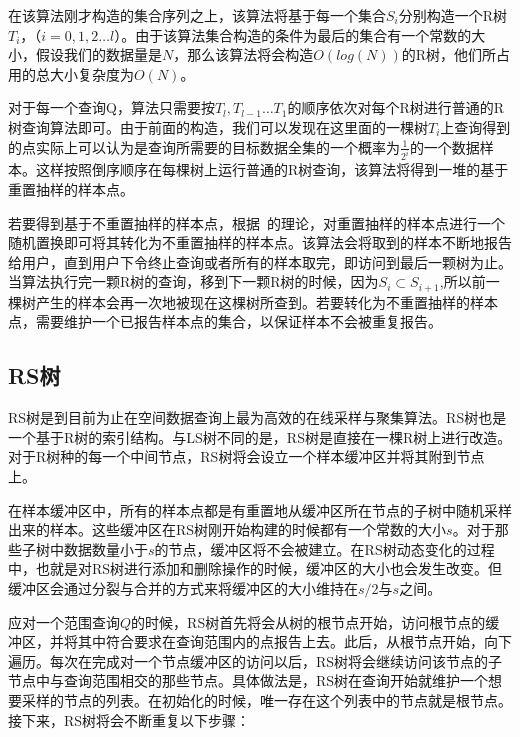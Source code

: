 在该算法刚才构造的集合序列之上，该算法将基于每一个集合$ S_{i} $分别构造一个R树$ T_{i} $，（$ i = 0,1,2 \dots l $）。由于该算法集合构造的条件为最后的集合有一个常数的大小，假设我们的数据量是$ N $，那么该算法将会构造$ O(log(N)) $的R树，他们所占用的总大小复杂度为$ O(N) $。

对于每一个查询Q，算法只需要按$ T_{l},T_{l-1} \dots T_{1} $的顺序依次对每个R树进行普通的R树查询算法即可。由于前面的构造，我们可以发现在这里面的一棵树$ T_{i} $上查询得到的点实际上可以认为是查询所需要的目标数据全集的一个概率为$ \frac{1}{2^i} $的一个数据样本。这样按照倒序顺序在每棵树上运行普通的R树查询，该算法将得到一堆的基于重置抽样的样本点。

若要得到基于不重置抽样的样本点，根据~\cite{RS07}的理论，对重置抽样的样本点进行一个随机置换即可将其转化为不重置抽样的样本点。该算法会将取到的样本不断地报告给用户，直到用户下令终止查询或者所有的样本取完，即访问到最后一颗树为止。当算法执行完一颗R树的查询，移到下一颗R树的时候，因为$ S_{i} \subset S_{i+1} $,所以前一棵树产生的样本会再一次地被现在这棵树所查到。若要转化为不重置抽样的样本点，需要维护一个已报告样本点的集合，以保证样本不会被重复报告。

\subsection{RS树}
RS树是到目前为止在空间数据查询上最为高效的在线采样与聚集算法。RS树也是一个基于R树的索引结构。与LS树不同的是，RS树是直接在一棵R树上进行改造。对于R树种的每一个中间节点，RS树将会设立一个样本缓冲区并将其附到节点上。

在样本缓冲区中，所有的样本点都是有重置地从缓冲区所在节点的子树中随机采样出来的样本。这些缓冲区在RS树刚开始构建的时候都有一个常数的大小$ s $。对于那些子树中数据数量小于$ s $的节点，缓冲区将不会被建立。在RS树动态变化的过程中，也就是对RS树进行添加和删除操作的时候，缓冲区的大小也会发生改变。但缓冲区会通过分裂与合并的方式来将缓冲区的大小维持在$ s/2 $与$ s $之间。

应对一个范围查询$ Q $的时候，RS树首先将会从树的根节点开始，访问根节点的缓冲区，并将其中符合要求在查询范围内的点报告上去。此后，从根节点开始，向下遍历。每次在完成对一个节点缓冲区的访问以后，RS树将会继续访问该节点的子节点中与查询范围相交的那些节点。具体做法是，RS树在查询开始就维护一个想要采样的节点的列表。在初始化的时候，唯一存在这个列表中的节点就是根节点。接下来，RS树将会不断重复以下步骤：

